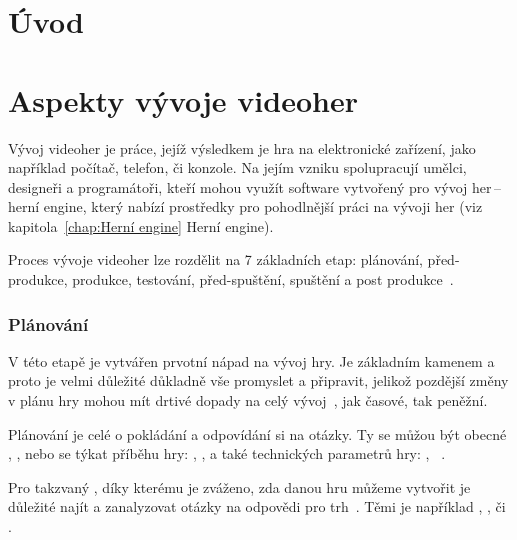 
%

\chapter{Úvod}

\chapter{Aspekty vývoje videoher}
Vývoj videoher je práce, jejíž výsledkem je hra na elektronické zařízení, jako například počítač, telefon, či konzole. Na jejím vzniku spolupracují umělci, designeři a programátoři, kteří mohou využít software vytvořený pro vývoj her\,--\,herní engine, který nabízí prostředky pro pohodlnější práci na vývoji her (viz kapitola~\ref{chap:Herní engine} Herní engine).

Proces vývoje videoher lze rozdělit na 7 základních etap: plánování, před-produkce, produkce, testování, před-spuštění, spuštění a post produkce~\cite{g2_game_development}.
\subsection*{Plánování}
V této etapě je vytvářen prvotní nápad na vývoj hry. Je základním kamenem a proto je velmi důležité důkladně vše promyslet a připravit, jelikož pozdější změny v plánu hry mohou mít drtivé dopady na celý vývoj~\cite{GameMaker_development}, jak časové, tak peněžní. 

Plánování je celé o pokládání a odpovídání si na otázky. Ty se můžou být obecné , , nebo se týkat příběhu hry: , ,  a také technických parametrů hry: , ~\cite{g2_game_development}.

Pro takzvaný , díky kterému je zváženo, zda danou hru můžeme vytvořit je důležité najít a zanalyzovat otázky na odpovědi pro trh~\cite{GameMaker_development}. Těmi je například , ,  či .

